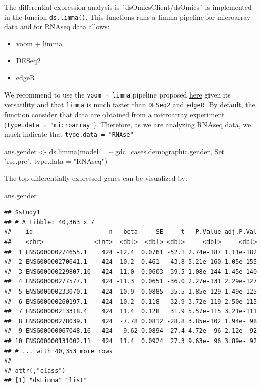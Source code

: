 \documentclass[
]{book}
\newenvironment{Shaded}{\begin{snugshade}}{\end{snugshade}}
\newcommand{\AttributeTok}[1]{\textcolor[rgb]{0.77,0.63,0.00}{#1}}
\newcommand{\FunctionTok}[1]{\textcolor[rgb]{0.00,0.00,0.00}{#1}}
\newcommand{\NormalTok}[1]{#1}
\newcommand{\OtherTok}[1]{\textcolor[rgb]{0.56,0.35,0.01}{#1}}
\newcommand{\SpecialCharTok}[1]{\textcolor[rgb]{0.00,0.00,0.00}{#1}}
\newcommand{\StringTok}[1]{\textcolor[rgb]{0.31,0.60,0.02}{#1}}
\providecommand{\tightlist}{%
  \setlength{\itemsep}{0pt}\setlength{\parskip}{0pt}}
\begin{document}
The differential expression analysis is ´dsOmicsClient/dsOmics´ is implemented in the funcion \texttt{ds.limma()}. This functions runs a limma-pipeline for microarray data and for RNAseq data allows:

\begin{itemize}
\tightlist
\item
  voom + limma
\item
  DESeq2
\item
  edgeR
\end{itemize}

We recommend to use the \texttt{voom\ +\ limma} pipeline proposed \href{https://f1000research.com/articles/5-1438/v2}{here} given its versatility and that \texttt{limma} is much faster than \texttt{DESeq2} and \texttt{edgeR}. By default, the function consider that data are obtained from a microarray experiment (\texttt{type.data\ =\ "microarray"}). Therefore, as we are analyzing RNAseq data, we much indicate that \texttt{type.data\ =\ "RNAse"}

\begin{Shaded}
\begin{Highlighting}[]
\NormalTok{ans.gender }\OtherTok{\textless{}{-}} \FunctionTok{ds.limma}\NormalTok{(}\AttributeTok{model =}  \SpecialCharTok{\textasciitilde{}}\NormalTok{ gdc\_cases.demographic.gender, }
                       \AttributeTok{Set =} \StringTok{"rse.pre"}\NormalTok{, }\AttributeTok{type.data =} \StringTok{"RNAseq"}\NormalTok{)}
\end{Highlighting}
\end{Shaded}

The top differentially expressed genes can be visualized by:

\begin{Shaded}
\begin{Highlighting}[]
\NormalTok{ans.gender}
\end{Highlighting}
\end{Shaded}

\begin{verbatim}
## $study1
## # A tibble: 40,363 x 7
##    id                     n   beta     SE     t   P.Value adj.P.Val
##    <chr>              <int>  <dbl>  <dbl> <dbl>     <dbl>     <dbl>
##  1 ENSG00000274655.1    424 -12.4  0.0761 -52.1 2.74e-187 1.11e-182
##  2 ENSG00000270641.1    424 -10.2  0.461  -43.8 5.21e-160 1.05e-155
##  3 ENSG00000229807.10   424 -11.0  0.0603 -39.5 1.08e-144 1.45e-140
##  4 ENSG00000277577.1    424 -11.3  0.0651 -36.0 2.27e-131 2.29e-127
##  5 ENSG00000233070.1    424  10.9  0.0885  35.5 1.85e-129 1.49e-125
##  6 ENSG00000260197.1    424  10.2  0.118   32.9 3.72e-119 2.50e-115
##  7 ENSG00000213318.4    424  11.4  0.128   31.9 5.57e-115 3.21e-111
##  8 ENSG00000278039.1    424  -7.78 0.0812 -28.8 3.85e-102 1.94e- 98
##  9 ENSG00000067048.16   424   9.62 0.0894  27.4 4.72e- 96 2.12e- 92
## 10 ENSG00000131002.11   424  11.4  0.0924  27.3 9.63e- 96 3.89e- 92
## # ... with 40,353 more rows
## 
## attr(,"class")
## [1] "dsLimma" "list"
\end{verbatim}
\end{document}
